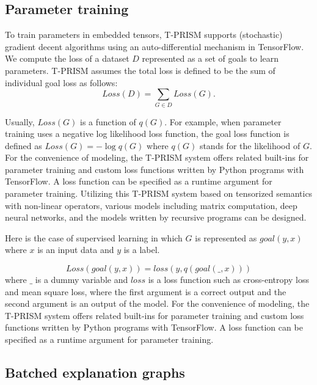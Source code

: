 \documentclass[a4paper]{report}
\begin{document}
\subsection*{Parameter training}

To train parameters in embedded tensors, T-PRISM supports (stochastic)
gradient  decent algorithms  using an  auto-differential mechanism  in
TensorFlow.  We compute the loss of a dataset $D$ represented as a set
of  goals to  learn parameters.   T-PRISM  assumes the  total loss  is
defined   to    be   the    sum   of    individual   goal    loss   as
follows:
\begin{equation}
Loss(D)=\sum_{G \in D} Loss(G).
\end{equation}

Usually, $Loss(G)$ is a function of $q(G)$. For example, when
parameter training uses a negative log likelihood loss function, the
goal loss function is defined as $Loss(G)=-\log q(G)$
where $q(G)$ stands for the likelihood of $G$.
For the convenience of modeling, the T-PRISM system offers related
built-ins for parameter training and custom loss functions written by
Python programs with TensorFlow.
A loss function can be specified as a runtime argument for parameter training.
Utilizing this T-PRISM system based on tensorized semantics with non-linear operators,
various models including matrix computation, deep neural networks, and the models written by recursive programs can be designed.


Here is the case of supervised learning in which $G$ is represented as
$goal(y,x)$ where $x$ is an input data and $y$ is a label.

\begin{equation}
Loss(goal(y,x))=loss(y,q(goal(\_,x)))
\label{eq:loss_supervision}
\end{equation}
where $\_$ is a dummy variable and $loss$ is a loss function such as
cross-entropy loss and mean square loss, where the first argument is a
correct output and the second argument is an output of the model. For
the convenience of modeling, the T-PRISM system offers related
built-ins for parameter training and custom loss functions written by
Python programs with TensorFlow. A loss function can be specified as
a runtime argument for parameter training.

\subsection*{Batched explanation graphs}
\label{sec:batched_eg}
\end{document}
